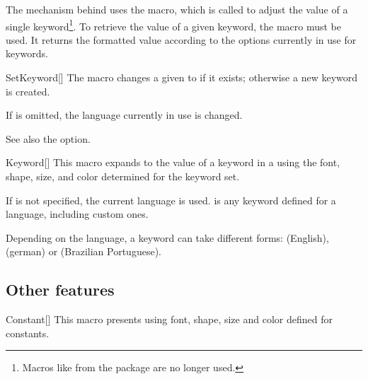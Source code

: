 \documentclass[a4paper, 11pt]{article}
\begin{document}
\begin{figure}
\end{figure}

The mechanism behind  uses the  macro, which is called to adjust the value of a single keyword\footnote{Macros like  from the  package are no longer used.}. To retrieve the value of a given keyword, the  macro must be used. It returns the formatted value according to the options currently in use for keywords.

\begin{macro}{SetKeyword}[]
    The macro  changes a given  to  if it exists; otherwise a new keyword is created.

    If  is omitted, the language currently in use is changed.

    See also the  option.
\end{macro}

\begin{macro}{Keyword}[]
    This macro expands to the value of a keyword in a  using the font, shape, size, and color determined for the keyword set.

    If  is not specified, the current language is used.  is any keyword defined for a language, including custom ones.
\end{macro}

\begin{tcblisting}{}
    Depending on the language, a keyword can take different forms:  (English),  (german) or  (Brazilian Portuguese).
\end{tcblisting}

\subsection{Other features}

\begin{macro}{Constant}[]
    This macro presents  using font, shape, size and color defined for constants.
\end{macro}
\end{document}

